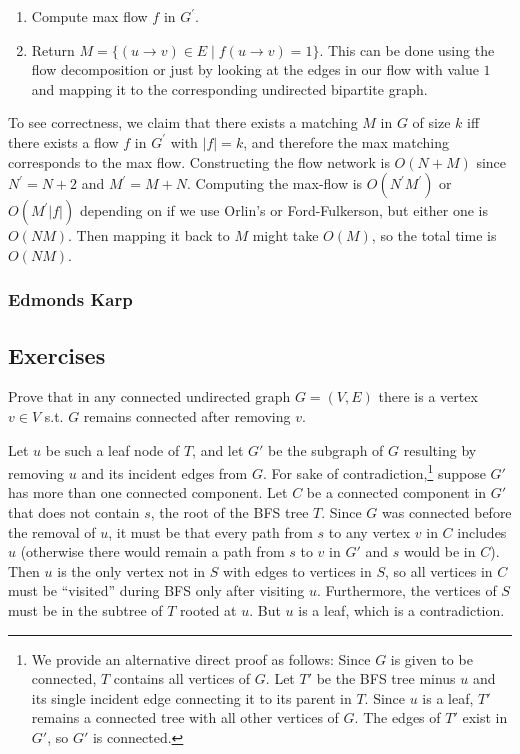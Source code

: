 \begin{example}
\begin{enumerate}
      \item Compute max flow $f$ in $G^\prime$. 
      \item Return $M = \{ (u \rightarrow v) \in E \mid f(u \rightarrow v) = 1 \}$. This can be done using the flow decomposition or just by looking at the edges in our flow with value $1$ and mapping it to the corresponding undirected bipartite graph. 
    \end{enumerate}
    To see correctness, we claim that there exists a matching $M$ in $G$ of size $k$ iff there exists a flow $f$ in $G^\prime$ with $|f|= k$, and therefore the max matching corresponds to the max flow. Constructing the flow network is $O(N + M)$ since $N^\prime = N + 2$ and $M^\prime = M + N$. Computing the max-flow is $O(N^\prime M^\prime)$ or $O(M^\prime |f|)$ depending on if we use Orlin's or Ford-Fulkerson, but either one is $O(NM)$. Then mapping it back to $M$ might take $O(M)$, so the total time is $O(NM)$. 
  \end{example}

\subsubsection{Edmonds Karp}

\subsection{Exercises}

  \begin{exercise}
    Prove that in any connected undirected graph $G = (V, E)$ there is a vertex $v \in V$ s.t. $G$ remains connected after removing $v$. 
  \end{exercise}
  \begin{solution}
    Let $u$ be such a leaf node of $T$, and let $G'$ be the subgraph of $G$ resulting by removing $u$ and its incident edges from $G$.
    For sake of contradiction,\footnote{We provide an alternative direct proof as follows: Since $G$ is given to be connected, $T$ contains all vertices of $G$. Let $T'$ be the BFS tree minus $u$ and its single incident edge connecting it to its parent in $T$. Since $u$ is a leaf, $T'$ remains a connected tree with all other vertices of $G$. The edges of $T'$ exist in $G'$, so $G'$ is connected.} suppose $G'$ has more than one connected component.
    Let $C$ be a connected component in $G'$ that does not contain $s$, the root of the BFS tree $T$.
    Since $G$ was connected before the removal of $u$, it must be that every path from $s$ to any vertex $v$ in $C$ includes $u$ (otherwise there would remain a path from $s$ to $v$ in $G'$ and $s$ would be in $C$).
    Then $u$ is the only vertex not in $S$ with edges to vertices in $S$, so all vertices in $C$ must be ``visited'' during BFS only after visiting $u$. Furthermore, the vertices of $S$ must be in the subtree of $T$ rooted at $u$. But $u$ is a leaf, which is a contradiction.
  \end{solution}

